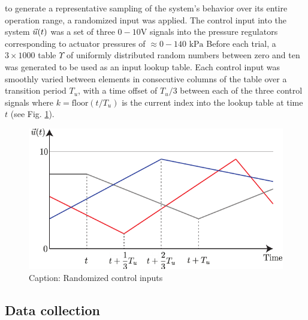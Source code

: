 to generate a representative sampling of the system's behavior over its entire operation range, a randomized input was applied.
The control input into the system $\vec{u} (t)$ was a set of three $0-10 \text{V}$  signals into the pressure regulators corresponding to actuator pressures of $\approx 0-140 \text{ kPa}$
Before each trial, a $3 \times 1000$ table $\Upsilon$ of uniformly distributed random numbers between zero and ten was generated to be used as an input lookup table.
Each control input was smoothly varied between elements in consecutive columns of the table over a transition period $T_u$, with a time offset of $T_u / 3$ between each of the three control signals
where $k = \text{floor}\left( {t} / {T_u} \right)$ is the current index into the lookup table at time $t$ (see Fig. \ref{fig:randInput}).

\begin{figure}
    \centering
    \includegraphics[width=\linewidth]{figures/randInput3dim.pdf}
    \caption{Caption: Randomized control inputs}
    \label{fig:randInput}
\end{figure}


\subsection{Data collection}

